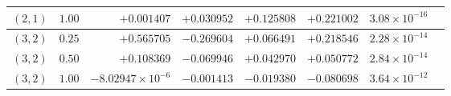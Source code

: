 \documentclass[aps,pra,reprint,amsmath,amssymb,floatfix,longbibliography]{revtex4-2}
\begin{document}
\begin{table}[t]
\begin{ruledtabular}
\begin{tabular}{ccrrrrrc}
$(2,1)$ & $1.00$ & $+0.001407$ & $+0.030952$ & $+0.125808$ & $+0.221002$ & $3.08\times 10^{-16}$ \\
\hline
$(3,2)$ & $0.25$ & $+0.565705$ & $-0.269604$ & $+0.066491$ & $+0.218546$ & $2.28\times 10^{-14}$ \\
$(3,2)$ & $0.50$ & $+0.108369$ & $-0.069946$ & $+0.042970$ & $+0.050772$ & $2.84\times 10^{-14}$ \\
$(3,2)$ & $1.00$ & $-8.02947\times 10^{-6}$ & $-0.001413$ & $-0.019380$ & $-0.080698$ & $3.64\times 10^{-12}$ \\
\end{tabular}
\end{ruledtabular}
\end{table}


\end{document}
